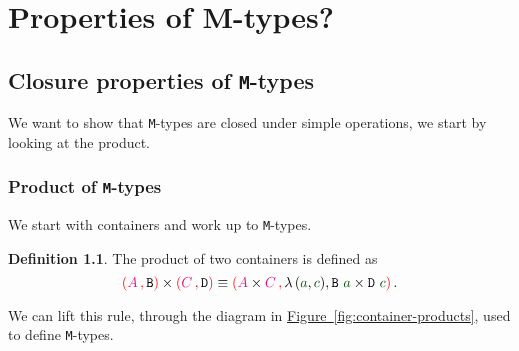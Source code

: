 \documentclass[twoside,11pt,openright]{report}
\theoremstyle{plain} %
\theoremstyle{definition}
\newtheorem{defn}[thm]{Definition}%
\theoremstyle{remark}
\newcommand*{\figref}[1]{\hyperref[fig:#1]{Figure~\ref*{fig:#1}}}
\newcommand*{\term}[1]{\textcolor{green!30!black}{#1}} %
\newcommand*{\type}[1]{\textcolor{magenta!90!black}{#1}}
\newcommand*{\containerpair}[2]{\ensuremath{\colorlet{savedleftcolor}{.}\color{red}\left(\color{savedleftcolor}#1\,\textcolor{red}{\mathbf{,}}\,#2\color{red}\right)\color{savedleftcolor}}}
\newcommand*{\typeformer}[1]{\ensuremath{\mathtt{#1}}}
\begin{document}
\chapter{Properties of M-types?}
\section{Closure properties of \texttt{M}-types}
We want to show that \texttt{M}-types are closed under simple operations, we start by looking at the product.
\subsection{Product of \texttt{M}-types}
We start with containers and work up to \texttt{M}-types.
\begin{defn}
  The product of two containers is defined as \cite{ContainerRules}
  \begin{equation}
    \containerpair{\type{A}}{\typeformer{B}} \times \containerpair{\type{C}}{\typeformer{D}} \equiv \containerpair{\type{A} \times \type{C}}{\lambda\,(\term{a} , \term{c}), \typeformer{B}~\term{a} \times \typeformer{D}~\term{c}}.
  \end{equation}
\end{defn}
\noindent We can lift this rule, through the diagram in \figref{container-products}, used to define \texttt{M}-types.
\end{document}
